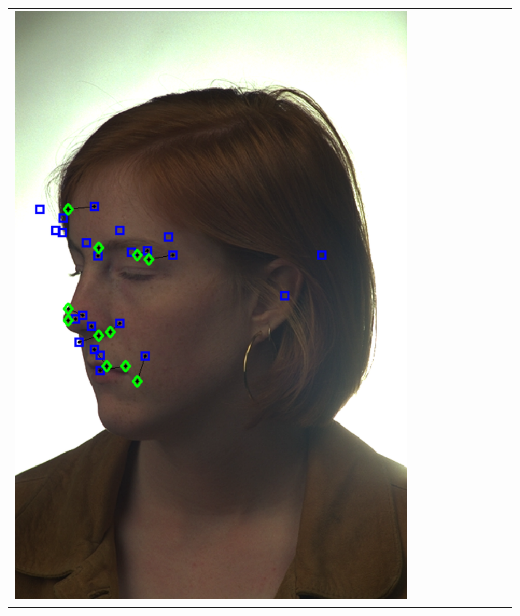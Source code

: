 \documentclass[landscape,final,a0paper,fontscale=0.27065]{baposter}
\begin{document}
\begin{poster}
{{\begin{tabular}{@{}rccccccc@{}}
 \parbox[c]{0.11\linewidth}{\includegraphics[width=\linewidth]{images/l_hl_fail.pdf}} &

\end{tabular}}}
\end{poster}
\end{document}
